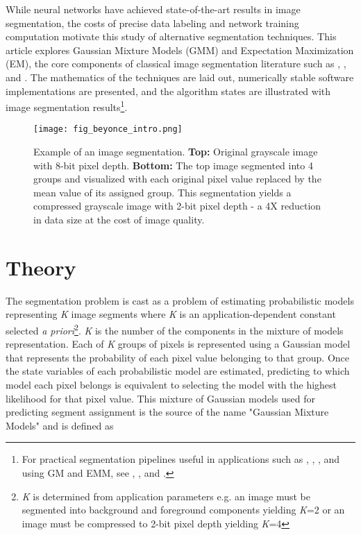 \documentclass[conference]{IEEEtran}
\begin{document}
While neural networks have achieved state-of-the-art results in image segmentation, the costs of precise data labeling and network training computation motivate this study of alternative segmentation techniques. This article explores Gaussian Mixture Models (GMM) and Expectation Maximization (EM), the core components of classical image segmentation literature such as \cite{GrabCut}, \cite{GrabCutInOneCut}, and \cite{DenseCut}. The mathematics of the techniques are laid out, numerically stable software implementations are presented, and the algorithm states are illustrated with image segmentation results\footnote{For practical segmentation pipelines useful in applications such as \cite{Fusion4D}, \cite{FVV}, \cite{SfSIL}, and \cite{IBVH} using GM and EMM, see \cite{GrabCut}, \cite{GrabCutInOneCut}, and \cite{DenseCut}.}.

\begin{figure}[ht]
\centering
\texttt{[image: fig\_beyonce\_intro.png]}
\caption{Example of an image segmentation. \textbf{Top:} Original grayscale image with 8-bit pixel depth. \textbf{Bottom:} The top image segmented into 4 groups and visualized with each original pixel value replaced by the mean value of its assigned group. This segmentation yields a compressed grayscale image with 2-bit pixel depth - a 4X reduction in data size at the cost of image quality.}
\label{fig:fig_beyonce_intro}
\vfill
\end{figure}  

\section{Theory}
The segmentation problem is cast as a problem of estimating probabilistic models representing \emph{K} image segments where \emph{K} is an application-dependent constant selected \emph{a priori}\footnote{\emph{K} is determined from application parameters e.g. an image must be segmented into background and foreground components yielding \emph{K}=2 or an image must be compressed to 2-bit pixel depth yielding \emph{K}=4}.  \emph{K} is the number of the components in the mixture of models representation. Each of \emph{K} groups of pixels is represented using a Gaussian model that represents the probability of each pixel value belonging to that group. Once the state variables of each probabilistic model are estimated, predicting to which model each pixel belongs is equivalent to selecting the model with the highest likelihood for that pixel value. This mixture of Gaussian models used for predicting segment assignment is the source of the name "Gaussian Mixture Models" and is defined as 
\end{document}
